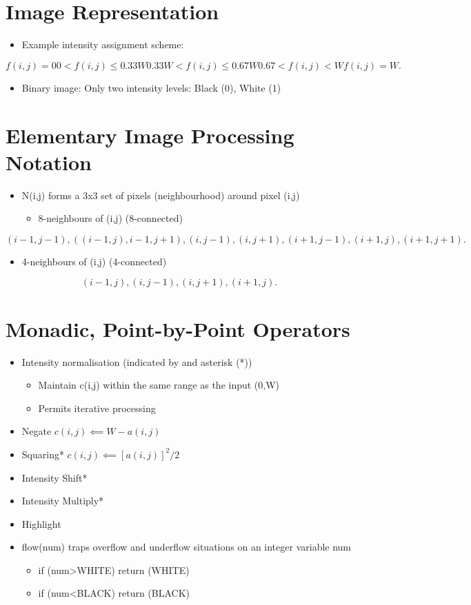 \documentclass[a4paper]{article}
\begin{document}
	\section{Image Representation}
	\begin{itemize}
		\item Example intensity assignment scheme:
	\end{itemize}
	\[
		f(i,j) = 0
		0 < f(i,j) \le 0.33W
		0.33W < f(i,j) \le 0.67W
		0.67 < f(i,j) < W
		f(i,j) = W
	.\] 
	\begin{itemize}
		\item Binary image: Only two intensity levels: Black (0), White (1)
	\end{itemize}
	\section{Elementary Image Processing Notation}
	\begin{itemize}
		\item N(i,j) forms a 3x3 set of pixels (neighbourhood) around pixel (i,j)
			\begin{itemize}
				\item 8-neighbours of (i,j) (8-connected)
			\end{itemize}
	\end{itemize}
	\[
	{(i-1, j-1),((i-1,j),i-1,j+1),(i,j-1),(i,j+1),(i+1,j-1),(i+1,j),(i+1,j+1)}
	.\] 
	\begin{itemize}
		\begin{itemize}
			\item 4-neighbours of (i,j) (4-connected)
		\end{itemize}
	\end{itemize}
	\[
	{(i-1,j),(i,j-1),(i,j+1),(i+1,j)}
	.\] 
	\section{Monadic, Point-by-Point Operators}
	\begin{itemize}
		\item Intensity normalisation (indicated by and asterisk (*))
		\begin{itemize}
			\item Maintain c(i,j) within the same range as the input (0,W)
			\item Permits iterative processing
		\end{itemize}
	\item Negate $c(i,j) \impliedby W-a(i,j)$
	\item Squaring* $c(i,j) \impliedby [a(i,j)]^2/2$
	\item Intensity Shift*
	\item Intensity Multiply*
	\item Highlight
	\item flow(num) traps overflow and underflow situations on an integer variable num
	\begin{itemize}
		\item if (num>WHITE) return (WHITE)
		\item if (num<BLACK) return (BLACK)
	\end{itemize}
	\end{itemize}
\end{document}
